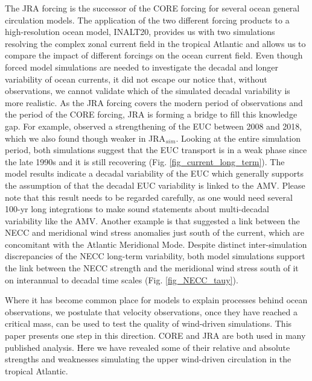 \documentclass[os, manuscript]{copernicus}
\begin{document}
The JRA forcing is the successor of the CORE forcing for several ocean general circulation models. The application of the two different forcing products to a high-resolution ocean model, INALT20, provides us with two simulations resolving the complex zonal current field in the tropical Atlantic and allows us to compare the impact of different forcings on the ocean current field. Even though forced model simulations are needed to investigate the decadal and longer variability of ocean currents, it did not escape our notice that, without observations, we cannot validate which of the simulated decadal variability is more realistic. As the JRA forcing covers the modern period of observations and the period of the CORE forcing, JRA is forming a bridge to fill this knowledge gap. For example, \cite{Brandt2021a} observed a strengthening of the EUC between 2008 and 2018, which we also found though weaker in JRA$_{sim}$. Looking at the entire simulation period, both simulations suggest that the EUC transport is in a weak phase since the late 1990s and it is still recovering (Fig. \ref{fig_current_long_term}). The model results indicate a decadal variability of the EUC which generally supports the assumption of \cite{Brandt2021a} that the decadal EUC variability is linked to the AMV. Please note that this result needs to be regarded carefully, as one would need several 100-yr long integrations to make sound statements about multi-decadal variability like the AMV. Another example is that \cite{Goes2013} suggested a link between the NECC and meridional wind stress anomalies just south of the current, which are concomitant with the Atlantic Meridional Mode. Despite distinct inter-simulation discrepancies of the NECC long-term variability, both model simulations support the link between the NECC strength and the meridional wind stress south of it on interannual to decadal time scales (Fig. \ref{fig_NECC_tauy}).

Where it has become common place for models to explain processes behind ocean observations, we postulate that velocity observations, once they have reached a critical mass, can be used to test the quality of wind-driven simulations. This paper presents one step in this direction. CORE and JRA are both used in many published analysis. Here we have revealed some of their relative and absolute strengths and weaknesses simulating the upper wind-driven circulation in the tropical Atlantic.


\end{document}
